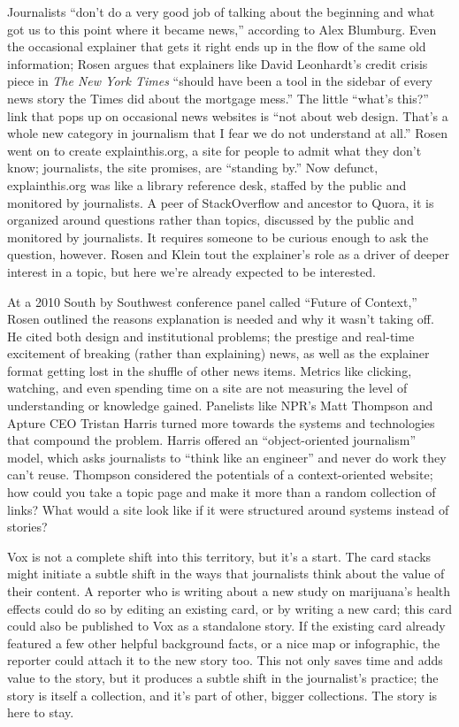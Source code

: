 Journalists ``don't do a very good job of talking about the beginning and what got us to this point where it became news,'' according to Alex Blumburg.\autocite{rosen_national_2008} Even the occasional explainer that gets it right ends up in the flow of the same old information; Rosen argues that explainers like David Leonhardt's credit crisis piece in \emph{The New York Times} ``should have been a tool in the sidebar of every news story the Times did about the mortgage mess.'' The little ``what's this?'' link that pops up on occasional news websites is ``not about web design. That's a whole new category in journalism that I fear we do not understand at all.'' Rosen went on to create explainthis.org, a site for people to admit what they don't know; journalists, the site promises, are ``standing by.''\autocite{_explainthis.org_2010} Now defunct, explainthis.org was like a library reference desk, staffed by the public and monitored by journalists. A peer of StackOverflow and ancestor to Quora, it is organized around questions rather than topics, discussed by the public and monitored by journalists. It requires someone to be curious enough to ask the question, however. Rosen and Klein tout the explainer's role as a driver of deeper interest in a topic, but here we're already expected to be interested.

At a 2010 South by Southwest conference panel called ``Future of Context,'' Rosen outlined the reasons explanation is needed and why it wasn't taking off. He cited both design and institutional problems; the prestige and real-time excitement of breaking (rather than explaining) news, as well as the explainer format getting lost in the shuffle of other news items.\autocite{rosen_news_2010} Metrics like clicking, watching, and even spending time on a site are not measuring the level of understanding or knowledge gained. Panelists like NPR's Matt Thompson and Apture CEO Tristan Harris turned more towards the systems and technologies that compound the problem. Harris offered an ``object-oriented journalism'' model, which asks journalists to ``think like an engineer'' and never do work they can't reuse. Thompson considered the potentials of a context-oriented website; how could you take a topic page and make it more than a random collection of links? What would a site look like if it were structured around systems instead of stories?\autocites[See][]{rosen_news_2010}{myers_liveblogging_2010}{hu_contextualizing_2010}

Vox is not a complete shift into this territory, but it's a start. The card stacks might initiate a subtle shift in the ways that journalists think about the value of their content. A reporter who is writing about a new study on marijuana's health effects could do so by editing an existing card, or by writing a new card; this card could also be published to Vox as a standalone story. If the existing card already featured a few other helpful background facts, or a nice map or infographic, the reporter could attach it to the new story too. This not only saves time and adds value to the story, but it produces a subtle shift in the journalist's practice; the story is itself a collection, and it's part of other, bigger collections. The story is here to stay.

